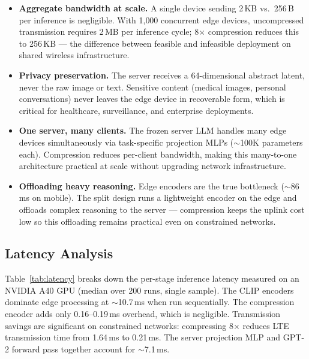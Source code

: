 \begin{itemize}
    \item \textbf{Aggregate bandwidth at scale.} A single device sending 2\,KB vs.\ 256\,B per inference is negligible. With 1{,}000 concurrent edge devices, uncompressed transmission requires 2\,MB per inference cycle; 8$\times$ compression reduces this to 256\,KB — the difference between feasible and infeasible deployment on shared wireless infrastructure.

    \item \textbf{Privacy preservation.} The server receives a 64-dimensional abstract latent, never the raw image or text. Sensitive content (medical images, personal conversations) never leaves the edge device in recoverable form, which is critical for healthcare, surveillance, and enterprise deployments.

    \item \textbf{One server, many clients.} The frozen server LLM handles many edge devices simultaneously via task-specific projection MLPs ($\sim$100K parameters each). Compression reduces per-client bandwidth, making this many-to-one architecture practical at scale without upgrading network infrastructure.

    \item \textbf{Offloading heavy reasoning.} Edge encoders are the true bottleneck ($\sim$86\,ms on mobile). The split design runs a lightweight encoder on the edge and offloads complex reasoning to the server — compression keeps the uplink cost low so this offloading remains practical even on constrained networks.
\end{itemize}

\subsection{Latency Analysis}

Table~\ref{tab:latency} breaks down the per-stage inference latency measured on an NVIDIA A40 GPU (median over 200 runs, single sample). The CLIP encoders dominate edge processing at $\sim$10.7\,ms when run sequentially. The compression encoder adds only 0.16--0.19\,ms overhead, which is negligible. Transmission savings are significant on constrained networks: compressing 8$\times$ reduces LTE transmission time from 1.64\,ms to 0.21\,ms. The server projection MLP and GPT-2 forward pass together account for $\sim$7.1\,ms.

